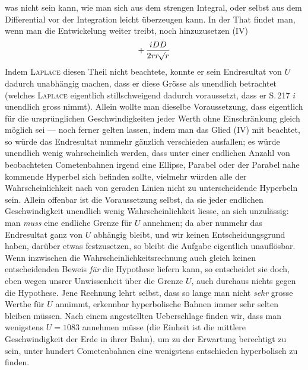 was nicht sein kann, wie man sich aus dem strengen Integral, oder selbst aus dem Differential vor
der Integration leicht überzeugen kann. In der That findet man, wenn man die Entwickelung weiter
treibt, noch hinzuzusetzen (IV)
\[+\,\frac{iDD}{2rr\mathord{{}^{}\!\surd}r}\]
Indem \textsc{Laplace} diesen Theil nicht beachtete, konnte er sein Endresultat von $U$ dadurch unabhängig
machen, dass er diese Grösse als unendlich betrachtet (welches \textsc{Laplace} eigentlich stillschweigend
dadurch voraussetzt, dass er S.\,217 $i$ unendlich gross nimmt). Allein wollte man dieselbe
Voraussetzung, dass eigentlich für die ursprünglichen Geschwindigkeiten jeder Werth ohne
Einschränkung gleich möglich sei --- noch ferner gelten lassen, indem man das Glied (IV) mit
beachtet, so würde das Endresultat nunmehr gänzlich verschieden ausfallen; es würde unendlich wenig
wahrscheinlich werden, dass unter einer endlichen Anzahl von beobachteten Cometenbahnen irgend eine
Ellipse, Parabel oder der Parabel nahe kommende Hyperbel sich befinden sollte, vielmehr würden alle
der Wahrscheinlichkeit nach von geraden Linien nicht zu unterscheidende Hyperbeln sein. Allein
offenbar ist die Voraussetzung selbst, da sie jeder endlichen Geschwindigkeit unendlich wenig
Wahrscheinlichkeit liesse, an sich unzulässig: man \emph{muss} eine endliche Grenze für $U$
annehmen; da aber nunmehr das Endresultat ganz von $U$ abhängig bleibt, und wir keinen
Entscheidungsgrund haben, darüber etwas festzusetzen, so bleibt die Aufgabe eigentlich unauflösbar.
Wenn inzwischen die Wahrscheinlichkeitsrechnung auch gleich keinen entscheidenden Beweis
\emph{für} die Hypothese liefern kann, so entscheidet sie doch, eben wegen unsrer Unwissenheit über
die Grenze $U$, auch durchaus nichts gegen die Hypothese. Jene Rechnung lehrt selbst, dass so lange
man nicht \emph{sehr} grosse Werthe für $U$ annimmt, erkennbar hyperbolische Bahnen immer sehr
selten bleiben müssen. Nach einem angestellten Ueberschlage finden wir, dass man wenigstens
$U = 1083$ annehmen müsse (die Einheit ist die mittlere Geschwindigkeit der Erde in ihrer Bahn), um
zu der Erwartung berechtigt zu sein, unter hundert Cometenbahnen eine wenigstens entschieden
hyperbolisch zu finden.

